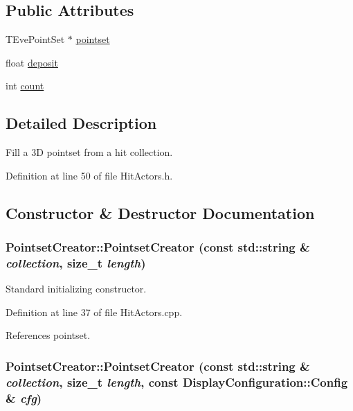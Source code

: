 \subsection*{Public Attributes}
\begin{DoxyCompactItemize}
\item 
TEvePointSet $\ast$ \hyperlink{struct_d_d4hep_1_1_pointset_creator_a59f3e1be9bcdc98a6d94a0c1dbee10bd}{pointset}
\item 
float \hyperlink{struct_d_d4hep_1_1_pointset_creator_a6caa5f448ed788b5ff8bcac223b6e5a8}{deposit}
\item 
int \hyperlink{struct_d_d4hep_1_1_pointset_creator_a190788682e1cb43e03549f1a03377502}{count}
\end{DoxyCompactItemize}


\subsection{Detailed Description}
Fill a 3D pointset from a hit collection. 

Definition at line 50 of file HitActors.h.

\subsection{Constructor \& Destructor Documentation}
\hypertarget{struct_d_d4hep_1_1_pointset_creator_abe227e7b97ff9fdca5a8251994a301df}{
\subsubsection[{PointsetCreator}]{\setlength{\rightskip}{0pt plus 5cm}PointsetCreator::PointsetCreator (const std::string \& {\em collection}, \/  size\_\-t {\em length})}}
\label{struct_d_d4hep_1_1_pointset_creator_abe227e7b97ff9fdca5a8251994a301df}


Standard initializing constructor. 

Definition at line 37 of file HitActors.cpp.

References pointset.\hypertarget{struct_d_d4hep_1_1_pointset_creator_af9e8ec4b156dce9ac15a0a0ee1214176}{
\subsubsection[{PointsetCreator}]{\setlength{\rightskip}{0pt plus 5cm}PointsetCreator::PointsetCreator (const std::string \& {\em collection}, \/  size\_\-t {\em length}, \/  const {\bf DisplayConfiguration::Config} \& {\em cfg})}}
\label{struct_d_d4hep_1_1_pointset_creator_af9e8ec4b156dce9ac15a0a0ee1214176}


